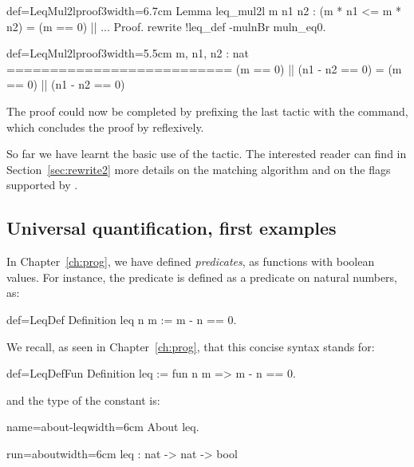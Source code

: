 \begin{coq}{def=LeqMul2lproof3}{width=6.7cm}
Lemma leq_mul2l m n1 n2 :
 (m * n1 <= m * n2) = (m == 0) || ...
Proof.
rewrite !leq_def -mulnBr muln_eq0.
\end{coq}
\begin{coqout}{def=LeqMul2lproof3}{width=5.5cm}
m, n1, n2 : nat
==========================
(m == 0) || (n1 - n2 == 0) =
  (m == 0) || (n1 - n2 == 0)
\end{coqout}

The proof could now be completed by prefixing the last tactic with the
 command, which concludes the proof by reflexively.

So far we have learnt the basic use of the  tactic.
The interested reader can find in Section~\ref{sec:rewrite2} more
details on the matching algorithm and on the flags supported by
.



\subsection{Universal quantification, first examples}
In Chapter~\ref{ch:prog}, we have defined \emph{predicates}, as functions
with boolean values. For instance, the  predicate is defined as
a predicate on natural numbers, as:
\begin{coq}{def=LeqDef}{}
Definition leq n m := m - n == 0.
\end{coq}

We recall, as seen in Chapter~\ref{ch:prog}, that this concise syntax stands
for:

\begin{coq}{def=LeqDefFun}{}
Definition leq := fun n m => m - n == 0.
\end{coq}
and the type of the constant  is:

\begin{coq}{name=about-leq}{width=6cm}
About leq.
\end{coq}
\begin{coqout}{run=about}{width=6cm}
leq : nat -> nat -> bool
\end{coqout}

